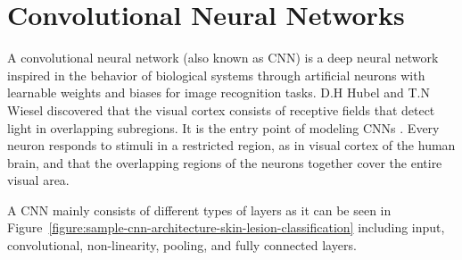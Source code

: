 \section{Convolutional Neural Networks}

    A convolutional neural network (also known as CNN) is a deep neural network inspired in the behavior of biological systems through artificial neurons with learnable weights and biases for image recognition tasks.
    D.H Hubel and T.N Wiesel discovered that the visual cortex consists of receptive fields that detect light in overlapping subregions.
    It is the entry point of modeling CNNs \cite{hubel1968receptive}.
    Every neuron responds to stimuli in a restricted region, as in visual cortex of the human brain, and that the overlapping regions of the neurons together cover the entire visual area.

    

    A CNN mainly consists of different types of layers as it can be seen in Figure~\ref{figure:sample-cnn-architecture-skin-lesion-classification} including input, convolutional, non-linearity, pooling, and fully connected layers.

